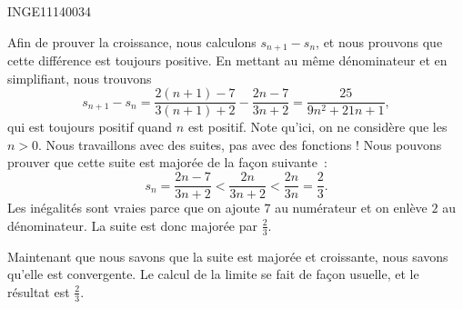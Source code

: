

\begin{corrige}{INGE11140034}

	Afin de prouver la croissance, nous calculons $s_{n+1}-s_n$, et nous prouvons que cette différence est toujours positive. En mettant au même dénominateur et en simplifiant, nous trouvons
	\begin{equation}
		s_{n+1}-s_n=\frac{ 2(n+1)-7 }{ 3(n+1)+2 }-\frac{ 2n-7 }{ 3n+2 }=\frac{ 25 }{ 9n^2+21n+1 },
	\end{equation}
	qui est toujours positif quand $n$ est positif. Note qu'ici, on ne considère que les $n>0$. Nous travaillons avec des suites, pas avec des fonctions !
	Nous pouvons prouver que cette suite est majorée de la façon suivante~:
	\begin{equation}
		s_n=\frac{ 2n-7 }{ 3n+2 }<\frac{ 2n }{ 3n+2 }<\frac{ 2n }{ 3n }=\frac{ 2 }{ 3 }.
	\end{equation}
	Les inégalités sont vraies parce que on ajoute $7$ au numérateur et on enlève $2$ au dénominateur. La suite est donc majorée par $\frac{ 2 }{ 3 }$.

	Maintenant que nous savons que la suite est majorée et croissante, nous savons qu'elle est convergente. Le calcul de la limite se fait de façon usuelle, et le résultat est $\frac{ 2 }{ 3 }$.

\end{corrige}
